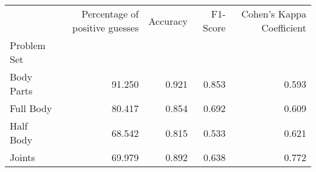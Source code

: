 \begin{table}
      \caption[]{}
      \label{}
      \begin{tabular}{lrrrr}
\hline
{} &  Percentage of positive guesses &  Accuracy &  F1-Score &  Cohen's Kappa Coefficient \\
Problem Set   &                                 &           &           &                            \\
\hline
Body Parts &                          91.250 &     0.921 &     0.853 &                      0.593 \\
Full Body  &                          80.417 &     0.854 &     0.692 &                      0.609 \\
Half Body  &                          68.542 &     0.815 &     0.533 &                      0.621 \\
Joints     &                          69.979 &     0.892 &     0.638 &                      0.772 \\
\hline
\end{tabular}
\end{table}